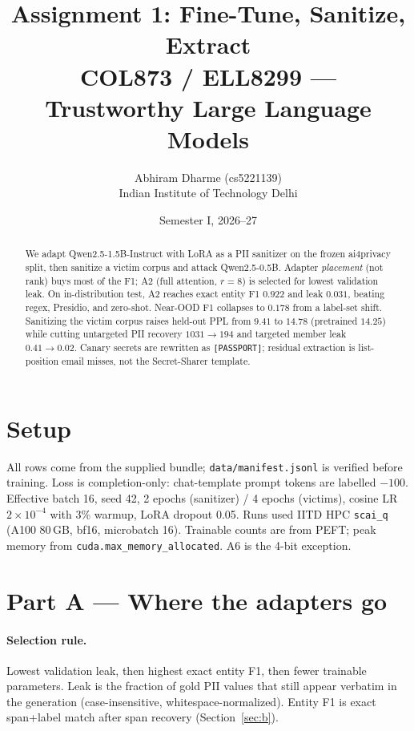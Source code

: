 \documentclass[11pt]{article}
\title{\vspace{-1.6em}Assignment 1: Fine-Tune, Sanitize, Extract\\[0.2em]
\large COL873 / ELL8299 --- Trustworthy Large Language Models}
\author{Abhiram Dharme \quad (cs5221139)\\
Indian Institute of Technology Delhi}
\date{Semester I, 2026--27}
\begin{document}
\maketitle
\vspace{-1.5em}

\begin{abstract}
\noindent
We adapt Qwen2.5-1.5B-Instruct with LoRA as a PII sanitizer on the frozen ai4privacy split, then sanitize a victim corpus and attack Qwen2.5-0.5B. Adapter \emph{placement} (not rank) buys most of the F1; A2 (full attention, $r{=}8$) is selected for lowest validation leak. On in-distribution test, A2 reaches exact entity F1 $0.922$ and leak $0.031$, beating regex, Presidio, and zero-shot. Near-OOD F1 collapses to $0.178$ from a label-set shift. Sanitizing the victim corpus raises held-out PPL from $9.41$ to $14.78$ (pretrained $14.25$) while cutting untargeted PII recovery $1031{\to}194$ and targeted member leak $0.41{\to}0.02$. Canary secrets are rewritten as \texttt{[PASSPORT]}; residual extraction is list-position email misses, not the Secret-Sharer template.
\end{abstract}

\vspace{-0.45em}
\section{Setup}
\vspace{-0.15em}
All rows come from the supplied bundle; \texttt{data/manifest.jsonl} is verified before training. Loss is completion-only: chat-template prompt tokens are labelled $-100$. Effective batch 16, seed 42, 2 epochs (sanitizer) / 4 epochs (victims), cosine LR $2{\times}10^{-4}$ with 3\% warmup, LoRA dropout 0.05. Runs used IITD HPC \texttt{scai\_q} (A100 80\,GB, bf16, microbatch 16). Trainable counts are from PEFT; peak memory from \texttt{cuda.max\_memory\_allocated}. A6 is the 4-bit exception.

\section{Part A --- Where the adapters go}
\vspace{-0.15em}
\paragraph{Selection rule.}
Lowest validation leak, then highest exact entity F1, then fewer trainable parameters. Leak is the fraction of gold PII values that still appear verbatim in the generation (case-insensitive, whitespace-normalized). Entity F1 is exact span+label match after span recovery (Section~\ref{sec:b}).
\end{document}
